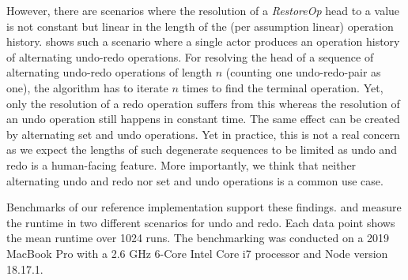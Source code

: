\documentclass[sigplan,natbib=false,review]{acmart}
\newcommand{\restopkind}{\textit{RestoreOp}}
\begin{document}
However, there are scenarios where the resolution of a \restopkind{} head
to a value is not constant but linear in the length
of the (per assumption linear) operation history.
 shows such a scenario where a single actor
produces an operation history of alternating undo-redo operations.
For resolving the head of a sequence of alternating undo-redo operations
of length $n$ (counting one undo-redo-pair as one),
the algorithm has to iterate $n$ times to find the terminal operation.
Yet, only the resolution of a redo operation suffers from this whereas
the resolution of an undo operation still happens in constant time.
The same effect can be created by alternating set and undo operations.
Yet in practice, this is not a real concern as we expect the lengths of such
degenerate sequences to be limited as undo and redo is a human-facing feature.
More importantly, we think that neither alternating undo and redo
nor set and undo operations is a common use case.

Benchmarks of our reference implementation support these findings.
 and  measure
the runtime in two different scenarios for undo and redo.
Each data point shows the mean runtime over 1024 runs.
The benchmarking was conducted on a 2019 MacBook Pro with a 
2.6 GHz 6-Core Intel Core i7 processor and Node version 18.17.1.
\end{document}
